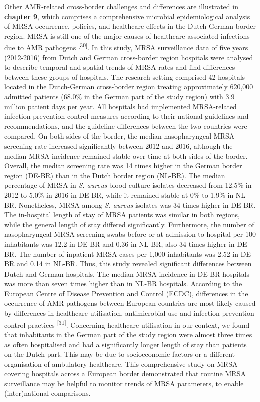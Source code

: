 \documentclass[
]{book}
\begin{document}
Other AMR-related cross-border challenges and differences are illustrated in \textbf{chapter 9}, which comprises a comprehensive microbial epidemiological analysis of MRSA occurrence, policies, and healthcare effects in the Dutch-German border region. MRSA is still one of the major causes of healthcare-associated infections due to AMR pathogens \textsuperscript{{[}30{]}}. In this study, MRSA surveillance data of five years (2012-2016) from Dutch and German cross-border region hospitals were analysed to describe temporal and spatial trends of MRSA rates and find differences between these groups of hospitals. The research setting comprised 42 hospitals located in the Dutch-German cross-border region treating approximately 620,000 admitted patients (68.0\% in the German part of the study region) with 3.9 million patient days per year. All hospitals had implemented MRSA-related infection prevention control measures according to their national guidelines and recommendations, and the guideline differences between the two countries were compared. On both sides of the border, the median nasopharyngeal MRSA screening rate increased significantly between 2012 and 2016, although the median MRSA incidence remained stable over time at both sides of the border. Overall, the median screening rate was 14 times higher in the German border region (DE-BR) than in the Dutch border region (NL-BR). The median percentage of MRSA in \emph{S. aureus} blood culture isolates decreased from 12.5\% in 2012 to 5.0\% in 2016 in DE-BR, while it remained stable at 0\% to 1.9\% in NL-BR. Nonetheless, MRSA among \emph{S. aureus} isolates was 34 times higher in DE-BR. The in-hospital length of stay of MRSA patients was similar in both regions, while the general length of stay differed significantly. Furthermore, the number of nasopharyngeal MRSA screening swabs before or at admission to hospital per 100 inhabitants was 12.2 in DE-BR and 0.36 in NL-BR, also 34 times higher in DE-BR. The number of inpatient MRSA cases per 1,000 inhabitants was 2.52 in DE-BR and 0.14 in NL-BR. Thus, this study revealed significant differences between Dutch and German hospitals. The median MRSA incidence in DE-BR hospitals was more than seven times higher than in NL-BR hospitals. According to the European Centre of Disease Prevention and Control (ECDC), differences in the occurrence of AMR pathogens between European countries are most likely caused by differences in healthcare utilisation, antimicrobial use and infection prevention control practices \textsuperscript{{[}31{]}}. Concerning healthcare utilisation in our context, we found that inhabitants in the German part of the study region were almost three times as often hospitalised and had a significantly longer length of stay than patients on the Dutch part. This may be due to socioeconomic factors or a different organisation of ambulatory healthcare. This comprehensive study on MRSA covering hospitals across a European border demonstrated that routine MRSA surveillance may be helpful to monitor trends of MRSA parameters, to enable (inter)national comparisons.
\end{document}
